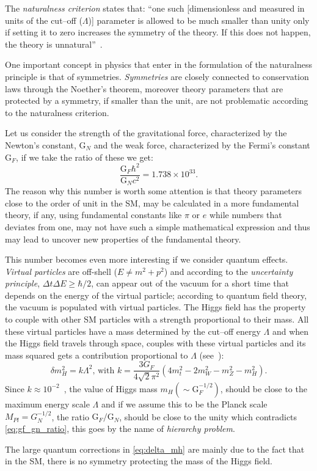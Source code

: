 The \emph{naturalness criterion} states that: ``one such [dimensionless and
measured in units of the cut--off ($\Lambda$)] parameter is allowed to be much
smaller than unity only if setting it to zero increases the symmetry of the
theory. If this does not happen, the theory is unnatural''~\cite{thooft:gauge}.

One important concept in physics that enter in the formulation of the
naturalness principle is that of symmetries. \emph{Symmetries} are closely
connected to conservation laws through the Noether's theorem, moreover theory
parameters that are protected by a symmetry, if smaller than the unit, are not
problematic according to the naturalness criterion.

Let us consider the strength of the gravitational force, characterized by the
Newton's constant, G$_N$ and the weak force, characterized by the Fermi's
constant G$_F$, if we take the ratio of these we get:
\begin{equation}
  \label{eq:gf_gn_ratio}
  \frac{\mathrm{G}_F \hbar^2}{\mathrm{G}_N c^2} = 1.738 \times 10^{33}.
\end{equation}
The reason why this number is worth some attention is that theory parameters
close to the order of unit in the SM, may be calculated in a more fundamental
theory, if any, using fundamental constants like $\pi$ or $e$ while numbers that
deviates from one, may not have such a simple mathematical expression and thus
may lead to uncover new properties of the fundamental theory.

This number becomes even more interesting if we consider quantum effects.
\emph{Virtual particles} are off-shell ($E \neq m^2 + p^2$) and according to the
\emph{uncertainty principle}, $\Delta t \Delta E \geq \hbar / 2$, can appear out
of the vacuum for a short time that depends on the energy of the virtual
particle; according to quantum field theory, the vacuum is populated with
virtual particles. The Higgs field has the property to couple with other SM
particles with a strength proportional to their mass. All these virtual
particles have a mass determined by the cut--off energy $\Lambda$ and when the
Higgs field travels through space, couples with these virtual particles and its
mass squared gets a contribution proportional to $\Lambda$
(see~\cite{Giudice:2008bi}):
\begin{equation}
  \label{eq:delta_mh}
  \delta m_H^2 = k \Lambda^2 \text{, with } k = \frac{3 G_F}{4 \sqrt{2}
    \pi^2}(4m_t^2 - 2m_W^2 - m_Z^2 - m_H^2).
\end{equation}
Since $k \approx 10^{-2}$~\cite{Giudice:2008bi}, the value of Higgs mass
$m_H (\sim \mathrm{G}_F^{-1/2})$, should be close to the maximum energy scale
$\Lambda$ and if we assume this to be the Planck scale $M_{Pl} = G_N^{-1/2}$, the
ratio $\mathrm{G}_F/\mathrm{G}_N$, should be close to the unity which
contradicts \cref{eq:gf_gn_ratio}, this goes by the name of \emph{hierarchy
  problem}.

The large quantum corrections in \cref{eq:delta_mh} are mainly due to the fact
that in the SM, there is no symmetry protecting the mass of the Higgs field.

